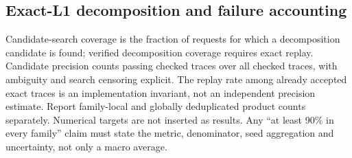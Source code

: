 \subsection{Exact-L1 decomposition and failure accounting}
Candidate-search coverage is the fraction of requests for which a decomposition candidate is found;
verified decomposition coverage requires exact replay. Candidate precision counts passing checked
traces over all checked traces, with ambiguity and search censoring explicit. The replay rate among
already accepted exact traces is an implementation invariant, not an independent precision estimate.
Report family-local and globally deduplicated product counts separately. Numerical targets are not
inserted as results. Any ``at least 90\% in every family'' claim must state the metric, denominator,
seed aggregation and uncertainty, not only a macro average.

